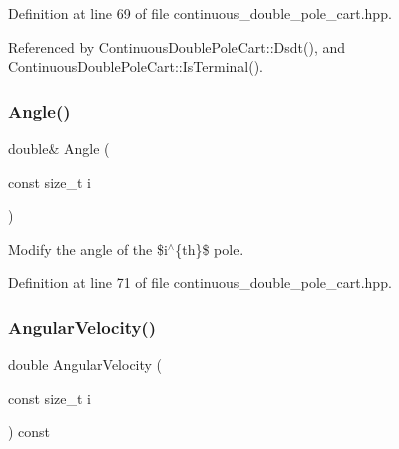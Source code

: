 Definition at line 69 of file continuous\+\_\+double\+\_\+pole\+\_\+cart.\+hpp.



Referenced by Continuous\+Double\+Pole\+Cart\+::\+Dsdt(), and Continuous\+Double\+Pole\+Cart\+::\+Is\+Terminal().

\mbox{\label{classmlpack_1_1rl_1_1ContinuousDoublePoleCart_1_1State_a142c4655f9f8e43ec2f0be2d0dc0b635}} 
\subsubsection{Angle()\hspace{0.1cm}{\footnotesize\ttfamily [2/2]}}
{\footnotesize\ttfamily double\& Angle (\begin{DoxyParamCaption}\item[{const size\+\_\+t}]{i }\end{DoxyParamCaption})\hspace{0.3cm}{\ttfamily [inline]}}



Modify the angle of the \$i$^\wedge$\{th\}\$ pole. 



Definition at line 71 of file continuous\+\_\+double\+\_\+pole\+\_\+cart.\+hpp.

\mbox{\label{classmlpack_1_1rl_1_1ContinuousDoublePoleCart_1_1State_adee020824f1381e77738134cb3e74c70}} 
\subsubsection{Angular\+Velocity()\hspace{0.1cm}{\footnotesize\ttfamily [1/2]}}
{\footnotesize\ttfamily double Angular\+Velocity (\begin{DoxyParamCaption}\item[{const size\+\_\+t}]{i }\end{DoxyParamCaption}) const\hspace{0.3cm}{\ttfamily [inline]}}



